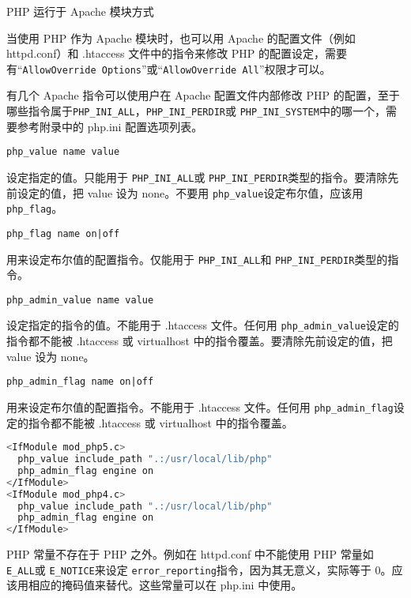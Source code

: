 \begin{compactitem}
\item PHP 运行于 Apache 模块方式

当使用 PHP 作为 Apache 模块时，也可以用 Apache 的配置文件（例如 httpd.conf）和 .htaccess 文件中的指令来修改 PHP 的配置设定，需要有“\texttt{AllowOverride Options}”或“\texttt{AllowOverride All}”权限才可以。

有几个 Apache 指令可以使用户在 Apache 配置文件内部修改 PHP 的配置，至于哪些指令属于\texttt{PHP\_INI\_ALL}，\texttt{PHP\_INI\_PERDIR}或 \texttt{PHP\_INI\_SYSTEM}中的哪一个，需要参考附录中的 php.ini 配置选项列表。

\begin{compactitem}
\item \texttt{php\_value name value}

设定指定的值。只能用于 \texttt{PHP\_INI\_ALL}或 \texttt{PHP\_INI\_PERDIR}类型的指令。要清除先前设定的值，把 value 设为 none。不要用 \texttt{php\_value}设定布尔值，应该用 \texttt{php\_flag}。

\item \texttt{php\_flag name on|off}

用来设定布尔值的配置指令。仅能用于 \texttt{PHP\_INI\_ALL}和 \texttt{PHP\_INI\_PERDIR}类型的指令。

\item \texttt{php\_admin\_value name value}

设定指定的指令的值。不能用于 .htaccess 文件。任何用 \texttt{php\_admin\_value}设定的指令都不能被 .htaccess 或 virtualhost 中的指令覆盖。要清除先前设定的值，把 value 设为 none。

\item \texttt{php\_admin\_flag name on|off}

用来设定布尔值的配置指令。不能用于 .htaccess 文件。任何用 \texttt{php\_admin\_flag}设定的指令都不能被 .htaccess 或 virtualhost 中的指令覆盖。





\end{compactitem}

\begin{lstlisting}[language=bash]
<IfModule mod_php5.c>
  php_value include_path ".:/usr/local/lib/php"
  php_admin_flag engine on
</IfModule>
<IfModule mod_php4.c>
  php_value include_path ".:/usr/local/lib/php"
  php_admin_flag engine on
</IfModule>
\end{lstlisting}

PHP 常量不存在于 PHP 之外。例如在 httpd.conf 中不能使用 PHP 常量如 \texttt{E\_ALL}或 \texttt{E\_NOTICE}来设定 \texttt{error\_reporting}指令，因为其无意义，实际等于 0。应该用相应的掩码值来替代。这些常量可以在 php.ini 中使用。


\end{compactitem}
